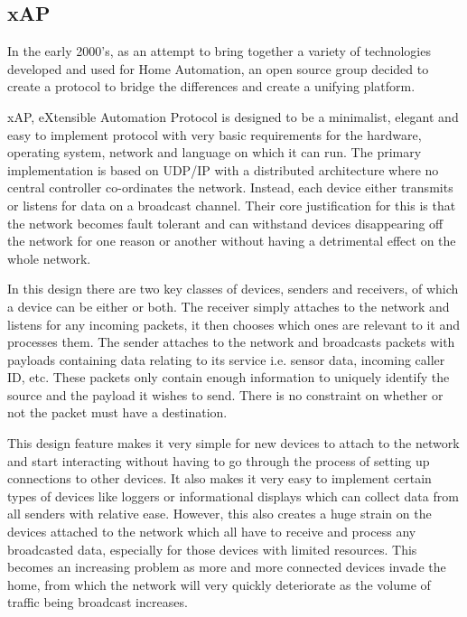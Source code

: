 \newpage


\subsection{xAP} %
\label{sub:xap}

In the early 2000's, as an attempt to bring together a variety of technologies developed and used for Home Automation, an open source group decided to create a protocol to bridge the differences and create a unifying platform.\cite{xAP}

xAP, eXtensible Automation Protocol is designed to be a minimalist, elegant and easy to implement protocol with very basic requirements for the hardware, operating system, network and language on which it can run.  
The primary implementation is based on UDP/IP with a distributed architecture where no central controller co-ordinates the network. Instead, each device either transmits or listens for data on a broadcast channel. Their core justification for this is that the network becomes fault tolerant and can withstand devices disappearing off the network for one reason or another without having a detrimental effect on the whole network.

In this design there are two key classes of devices, senders and receivers, of which a device can be either or both. 
The receiver simply attaches to the network and listens for any incoming packets, it then chooses which ones are relevant to it and processes them.
The sender attaches to the network and broadcasts packets with payloads containing data relating to its service i.e. sensor data, incoming caller ID, etc. These packets only contain enough information to uniquely identify the source and the payload it wishes to send. There is no constraint on whether or not the packet must have a destination.

This design feature makes it very simple for new devices to attach to the network and start interacting without having to go through the process of setting up connections to other devices. It also makes it very easy to implement certain types of devices like loggers or informational displays which can collect data from all senders with relative ease. However, this also creates a huge strain on the devices attached to the network which all have to receive and process any broadcasted data, especially for those devices with limited resources. This becomes an increasing problem as more and more connected devices invade the home, from which the network will very quickly deteriorate as the volume of traffic being broadcast increases.

